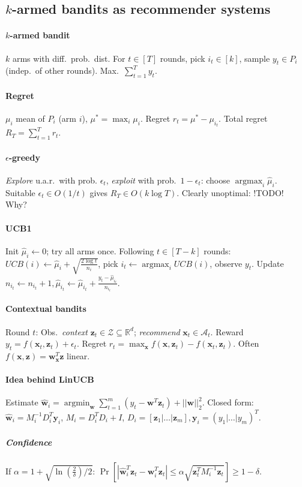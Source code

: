 \documentclass[10pt]{scrartcl}
\DeclareMathOperator{\argmin}{argmin}
\DeclareMathOperator{\argmax}{argmax}
\newcommand{\eps}{\epsilon}
\newcommand{\R}{\mathbb{R}}
\begin{document}
\begin{multicols}{3}
\section{$k$-armed bandits as recommender systems}
\paragraph{$k$-armed bandit}
$k$ arms with diff.\ prob.\ dist. For $t \in [T]$ rounds, pick $i_t\in[k]$, sample $y_t \in P_i$ (indep.\ of other rounds). Max.\ $\sum_{t=1}^{T} y_t$.
\paragraph{Regret}
$\mu_i$ mean of $P_i$ (arm $i$), $\mu^* = \max_i \mu_i$.
Regret $r_t = \mu^* - \mu_{i_t}$.
Total regret $R_T = \sum_{t=1}^{T} r_t$.
\paragraph{$\eps$-greedy} \emph{Explore} u.a.r.\ with prob. $\eps_t$, \emph{exploit} with prob.\ $1-\eps_t$: choose $\argmax_i\hat\mu_i$.
Suitable $\eps_t \in O(1/t)$ gives $R_T \in O(k\log T)$.
Clearly unoptimal: !TODO! Why?
\paragraph{UCB1}
Init $\hat\mu_i \leftarrow 0$; try all arms once.
Following $t \in [T-k]$ rounds: $UCB(i) \leftarrow \hat\mu_i+\sqrt{\frac{2\log t}{n_i}}$, pick $i_t \leftarrow \argmax_i UCB(i)$, observe $y_t$. Update $n_{i_t} \leftarrow n_{i_t}+1, \hat\mu_{i_t}\leftarrow\hat\mu_{i_t}+\frac{y_t-\hat\mu_{i_t}}{n_{i_t}}$.
\paragraph{Contextual bandits}
Round $t$: Obs.\ \emph{context} $\bm z_t \in\mathcal Z \subseteq \R^d$; \emph{recommend} $\bm x_t \in \mathcal A_t$.
Reward $y_t = f(\bm x_t,\bm z_t) + \eps_t$.
Regret $r_t = \max_{\bm x}f(\bm x, \bm z_t) - f(\bm x_t,\bm z_t)$.
Often $f(\bm x,\bm z) = \bm w_{\bm x}^T\bm z$ linear.

\paragraph{Idea behind LinUCB}
Estimate $\hat{\bm w}_{i} = \argmin_{\bm w}\sum_{t=1}^{m}(y_t-\bm w^T\bm z_t) + ||\bm w||_2^2$.
Closed form: $\hat{\bm w}_{i} = M_{i}^{-1}D_{i}^T\bm y_{i}$,
$M_{i} = D_{i}^TD_{i} + I$,
$D_{i} = [\bm z_1|\dots|\bm z_m], \bm y_{i} = (y_1|\dots|y_m)^T$.
\subparagraph{Confidence} If $\alpha = 1 + \sqrt{\ln(\frac{2}{\delta})/2}$: \newline
$\Pr\left [|\hat{\bm w}_{i}^T\bm z_t - \bm w_{i}^T\bm z_t| \leq \alpha\sqrt{\bm z_t^T M_{i}^{-1}\bm z_t}\right ] \geq 1-\delta$.


\end{multicols}
\end{document}
